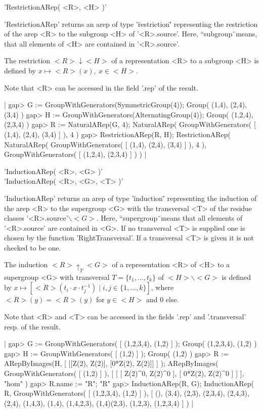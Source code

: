 
'RestrictionARep( <R>, <H> )'

'RestrictionARep' returns an arep of type '\"restriction\"' 
representing the restriction of the arep <R> to 
the subgroup <H> of '<R>.source'. Here, ``subgroup\"\ means, 
that all elements of <H> are contained in '<R>.source'.

The restriction $<R>\downarrow <H>$ of a representation <R> 
to a subgroup <H> is defined by $x\mapsto <R>(x),\ x\in <H>$.

Note that <R> can be accessed in the field '.rep' of the result.

|    gap> G := GroupWithGenerators(SymmetricGroup(4));
    Group( (1,4), (2,4), (3,4) )
    gap> H := GroupWithGenerators(AlternatingGroup(4));
    Group( (1,2,4), (2,3,4) )
    gap> R := NaturalARep(G, 4);
    NaturalARep( GroupWithGenerators( [ (1,4), (2,4), (3,4) ] ), 4 )
    gap> RestrictionARep(R, H);
    RestrictionARep(
      NaturalARep( GroupWithGenerators( [ (1,4), (2,4), (3,4) ] ), 4 ),
      GroupWithGenerators( [ (1,2,4), (2,3,4) ] )
    ) |


'InductionARep( <R>, <G> )'\\
'InductionARep( <R>, <G>, <T> )'

'InductionARep' returns an arep of type '\"induction\"' 
representing the induction of the arep <R> to 
the supergroup <G> with the transversal <T> of the residue classes
'<R>.source'$\backslash <G>$. Here, ``supergroup\"\ means 
that all elements of '<R>.source' are contained in <G>. If no
transversal <T> is supplied one is chosen by the function
'RightTransversal'. If a transversal <T> is given it is not checked
to be one.

The induction $<R>\uparrow_T <G>$ of a representation <R> of <H> to 
a supergroup <G> with transversal $T = \{t_1,\dots,t_k\}$ of 
$<H>\backslash <G>$ is defined by 
$x\mapsto\left[
\dot{<R>}\left(t_i\cdot x\cdot t_j^{-1}\right)
\mid i,j\in\{1,\dots,k\}\right]$, 
where $\dot{<R>}(y) = <R>(y)$ for $y\in <H>$ and 0 else.

Note that <R> and <T> can be accessed in the fields 
'.rep' and '.transversal' resp. of the result.

|    gap> G := GroupWithGenerators( [ (1,2,3,4), (1,2) ] );
    Group( (1,2,3,4), (1,2) )
    gap> H := GroupWithGenerators( [ (1,2) ] );
    Group( (1,2) )
    gap> R := ARepByImages(H, [ [[Z(2), Z(2)], [0*Z(2), Z(2)]] ] );
    ARepByImages(
      GroupWithGenerators( [ (1,2) ] ),
      [ [ [ Z(2)^0, Z(2)^0 ], [ 0*Z(2), Z(2)^0 ] ]
      ],
      "hom"
    )
    gap> R.name := "R";
    "R"
    gap> InductionARep(R, G);
    InductionARep(
      R,
      GroupWithGenerators( [ (1,2,3,4), (1,2) ] ),
      [ (), (3,4), (2,3), (2,3,4), (2,4,3), (2,4), (1,4,3), 
      (1,4), (1,4,2,3), (1,4)(2,3), (1,2,3), (1,2,3,4) ]
    ) |

